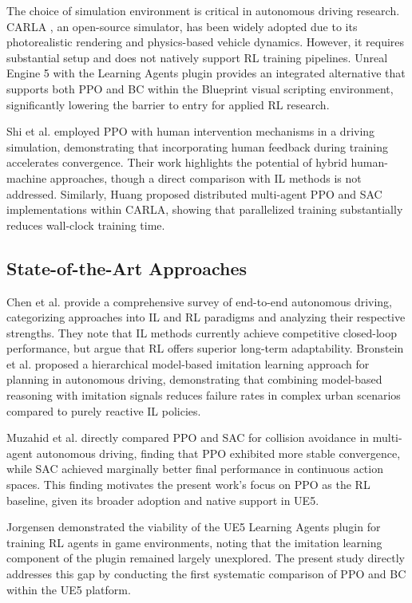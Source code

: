 \documentclass[conference]{IEEEtran}
\begin{document}
\text The choice of simulation environment is critical in autonomous driving research. CARLA \cite{dosovitskiy2017carla}, an open-source simulator, has been widely adopted due to its photorealistic rendering and physics-based vehicle dynamics. However, it requires substantial setup and does not natively support RL training pipelines. Unreal Engine 5 with the Learning Agents plugin \cite{epicgames2024plugin} provides an integrated alternative that supports both PPO and BC within the Blueprint visual scripting environment, significantly lowering the barrier to entry for applied RL research.

\text Shi et al. \cite{shi2024ppo} employed PPO with human intervention mechanisms in a driving simulation, demonstrating that incorporating human feedback during training accelerates convergence. Their work highlights the potential of hybrid human-machine approaches, though a direct comparison with IL methods is not addressed. Similarly, Huang \cite{huang2022distributed} proposed distributed multi-agent PPO and SAC implementations within CARLA, showing that parallelized training substantially reduces wall-clock training time.

\subsection{State-of-the-Art Approaches}

\text Chen et al. \cite{chen2024endtoend} provide a comprehensive survey of end-to-end autonomous driving, categorizing approaches into IL and RL paradigms and analyzing their respective strengths. They note that IL methods currently achieve competitive closed-loop performance, but argue that RL offers superior long-term adaptability. Bronstein et al. \cite{bronstein2022hierarchical} proposed a hierarchical model-based imitation learning approach for planning in autonomous driving, demonstrating that combining model-based reasoning with imitation signals reduces failure rates in complex urban scenarios compared to purely reactive IL policies.

\text Muzahid et al. \cite{muzahid2021comparison} directly compared PPO and SAC for collision avoidance in multi-agent autonomous driving, finding that PPO exhibited more stable convergence, while SAC achieved marginally better final performance in continuous action spaces. This finding motivates the present work's focus on PPO as the RL baseline, given its broader adoption and native support in UE5.

\text Jorgensen \cite{jorgensen2023killers} demonstrated the viability of the UE5 Learning Agents plugin for training RL agents in game environments, noting that the imitation learning component of the plugin remained largely unexplored. The present study directly addresses this gap by conducting the first systematic comparison of PPO and BC within the UE5 platform.
\end{document}
